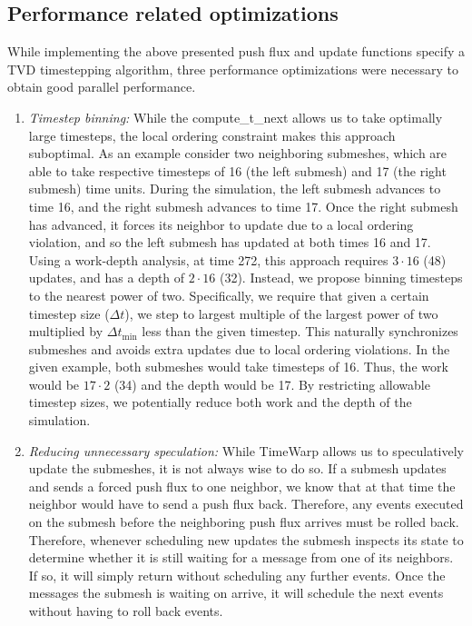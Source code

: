 \subsection{Performance related optimizations}
\label{sec:performance-optimization}
While implementing the above presented push flux and update functions specify a TVD timestepping algorithm, three performance optimizations were necessary to obtain good parallel performance.
\begin{enumerate}
    \item {\em Timestep binning:} While the {\sc compute\_t\_next} allows us to take optimally large timesteps, the local ordering constraint makes this approach suboptimal. As an example consider two neighboring submeshes, which are able to take respective timesteps of 16 (the left submesh) and 17 (the right submesh) time units. During the simulation, the left submesh advances to time 16, and the right submesh advances to time 17. Once the right submesh has advanced, it forces its neighbor to update due to a local ordering violation, and so the left submesh has updated at both times 16 and 17. Using a work-depth analysis, at time 272, this approach requires $3\cdot 16$ (48) updates, and has a depth of $2\cdot 16$ (32). Instead, we propose binning timesteps to the nearest power of two. Specifically, we require that given a certain timestep size ($\Delta t$), we step to largest multiple of the largest power of two multiplied by $\Delta t_{\min}$ less than the given timestep. This naturally synchronizes submeshes and avoids extra updates due to local ordering violations. In the given example, both submeshes would take timesteps of 16. Thus, the work would be $17\cdot 2$ (34) and the depth would be 17. By restricting allowable timestep sizes, we potentially reduce both work and the depth of the simulation.
    \item {\em Reducing unnecessary speculation:} While TimeWarp allows us to speculatively update the submeshes, it is not always wise to do so. If a submesh updates and sends a forced push flux to one neighbor, we know that at that time the neighbor would have to send a push flux back. Therefore, any events executed on the submesh before the neighboring push flux arrives must be rolled back. Therefore, whenever scheduling new updates the submesh inspects its state to determine whether it is still waiting for a message from one of its neighbors. If so, it will simply return without scheduling any further events. Once the messages the submesh is waiting on arrive, it will schedule the next events without having to roll back events.

\end{enumerate}
